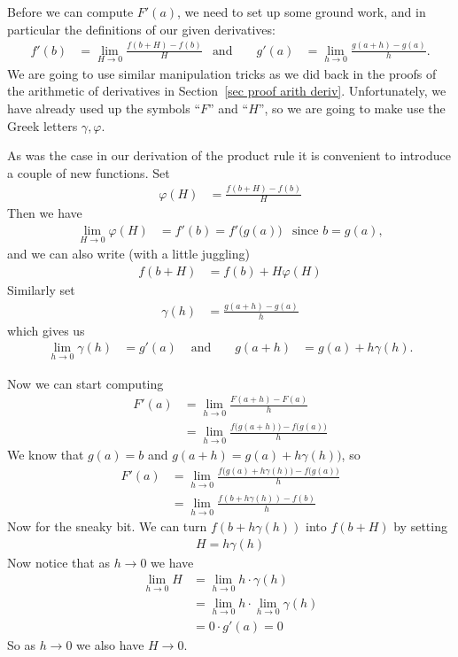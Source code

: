 Before we can compute $F'(a)$, we need to set up some
ground work, and in particular the definitions of our given derivatives:
\begin{align*}
  f'(b) &= \lim_{H \to 0} \frac{f(b+H)-f(b)}{H} & \text{and }&&
  g'(a) &= \lim_{h \to 0} \frac{g(a+h)-g(a)}{h}.
\end{align*}
We are going to use similar manipulation tricks as we did back in the proofs of the
arithmetic of derivatives in Section~\ref{sec proof arith deriv}. Unfortunately, we have
already used up the symbols ``$F$'' and ``$H$'', so we are going to make use the Greek
letters $\gamma, \varphi$.

\newcommand{\tf}{\varphi}
\newcommand{\tg}{\gamma}

As was the case in our derivation of the product rule it is convenient to
introduce a couple of new functions. Set
\begin{align*}
  \tf(H) &= \frac{f(b+H)-f(b)}{H}
\end{align*}
Then we have
\begin{align}\label{eq:DIFFcrtildef}
  \lim_{H \to 0} \tf(H) &= f'(b) = f'\big(g(a)\big) & \text{since $b=g(a)$},
\end{align}
and we can also write (with a little juggling)
\begin{align*}
  f(b+H) &= f(b) + H \tf(H)
\end{align*}
Similarly set
\begin{align*}
  \tg(h) &= \frac{g(a+h)-g(a)}{h}
\end{align*}
which gives us
\begin{align*}%
  \lim_{h \to 0} \tg(h) &= g'(a)
  & \text{ and } &&
  g(a+h) &= g(a) + h \tg(h).
\end{align*}

Now we can start computing
\begin{align*}
  F'(a) &= \lim_{h \to 0} \frac{F(a+h)-F(a)}{h} \\
  &= \lim_{h \to 0} \frac{f\big(g(a+h)\big)-f\big(g(a)\big)}{h}
\end{align*}
We know that $g(a) = b$ and $g(a+h) = g(a) + h \tg(h))$, so
\begin{align*}
  F'(a)
  &= \lim_{h \to 0} \frac{f\big(g(a) + h\tg(h) \big)-f\big(g(a)\big)}{h} \\
  &= \lim_{h \to 0} \frac{f(b + h\tg(h) )-f(b)}{h}
\end{align*}
Now for the sneaky bit. We can turn $f(b + h\tg(h) )$
into $f(b+H)$ by setting
\begin{align*}
H = h\tg(h)
\end{align*}
Now notice that as $h \to 0$ we have
\begin{align*}
  \lim_{h \to 0} H &= \lim_{h \to 0} h \cdot \tg(h) \\
  &= \lim_{h \to 0} h \cdot \lim_{h \to 0} \tg(h) \\
  &= 0 \cdot g'(a) = 0
\end{align*}
So as $h\to 0$ we also have $H \to 0$.

